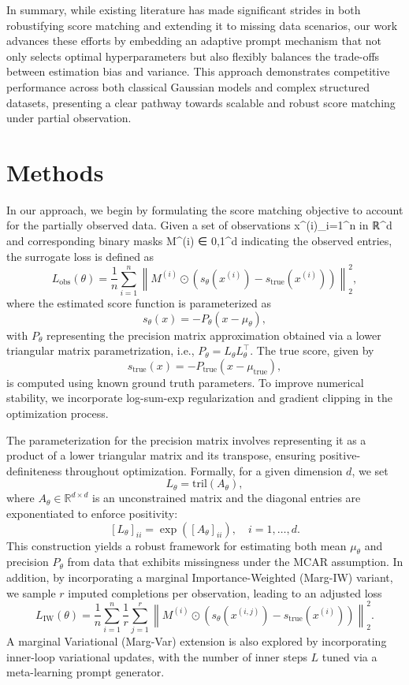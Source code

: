 \documentclass{article}
\begin{document}
In summary, while existing literature has made significant strides in both robustifying score matching and extending it to missing data scenarios, our work advances these efforts by embedding an adaptive prompt mechanism that not only selects optimal hyperparameters but also flexibly balances the trade-offs between estimation bias and variance. This approach demonstrates competitive performance across both classical Gaussian models and complex structured datasets, presenting a clear pathway towards scalable and robust score matching under partial observation.

\section{Methods}
In our approach, we begin by formulating the score matching objective to account for the partially observed data. Given a set of observations {x^(i)}_{i=1}^n in ℝ^d and corresponding binary masks M^(i) ∈ {0,1}^d indicating the observed entries, the surrogate loss is defined as 
\[
L_{\mathrm{obs}}(\theta) = \frac{1}{n} \sum_{i=1}^n \left\| M^{(i)} \odot \left(s_\theta(x^{(i)}) - s_{\mathrm{true}}(x^{(i)})\right) \right\|_2^2,
\]
where the estimated score function is parameterized as 
\[
s_\theta(x) = -P_\theta (x - \mu_\theta),
\]
with \(P_\theta\) representing the precision matrix approximation obtained via a lower triangular matrix parametrization, i.e., \(P_\theta = L_\theta L_\theta^\top\). The true score, given by 
\[
s_{\mathrm{true}}(x) = -P_{\mathrm{true}} (x-\mu_{\mathrm{true}}),
\]
is computed using known ground truth parameters. To improve numerical stability, we incorporate log-sum-exp regularization and gradient clipping in the optimization process.

The parameterization for the precision matrix involves representing it as a product of a lower triangular matrix and its transpose, ensuring positive-definiteness throughout optimization. Formally, for a given dimension \(d\), we set 
\[
L_\theta = \mathrm{tril}(A_\theta),
\]
where \(A_\theta \in \mathbb{R}^{d \times d}\) is an unconstrained matrix and the diagonal entries are exponentiated to enforce positivity:
\[
[L_\theta]_{ii} = \exp\left( [A_\theta]_{ii} \right), \quad i=1,\ldots,d.
\]
This construction yields a robust framework for estimating both mean \(\mu_\theta\) and precision \(P_\theta\) from data that exhibits missingness under the MCAR assumption. In addition, by incorporating a marginal Importance-Weighted (Marg-IW) variant, we sample \(r\) imputed completions per observation, leading to an adjusted loss
\[
L_{\mathrm{IW}}(\theta) = \frac{1}{n} \sum_{i=1}^n \frac{1}{r} \sum_{j=1}^r \left\| M^{(i)} \odot \left(s_\theta(x^{(i,j)}) - s_{\mathrm{true}}(x^{(i)})\right) \right\|_2^2.
\]
A marginal Variational (Marg-Var) extension is also explored by incorporating inner-loop variational updates, with the number of inner steps \(L\) tuned via a meta-learning prompt generator.
\end{document}
